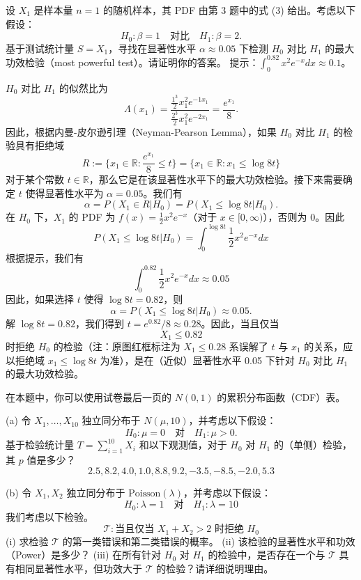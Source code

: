 \begin{questions}
\question
设 $X_1$ 是样本量 $n=1$ 的随机样本，其 PDF 由第 3 题中的式 (3) 给出。考虑以下假设：
\[
H_0 : \beta = 1 \quad \text{对比} \quad H_1 : \beta = 2.
\]
基于测试统计量 $S = X_1$，寻找在显著性水平 $\alpha \approx 0.05$ 下检测 $H_0$ 对比 $H_1$ 的最大功效检验（most powerful test）。请证明你的答案。
提示：$\int_0^{0.82} x^2 e^{-x} dx \approx 0.1$。

\begin{solution}
$H_0$ 对比 $H_1$ 的似然比为
\[
\Lambda(x_1) = \frac{\frac{1^3}{2} x_1^2 e^{-1x_1}}{\frac{2^3}{2} x_1^2 e^{-2x_1}} = \frac{e^{x_1}}{8}.
\]
因此，根据内曼-皮尔逊引理（Neyman-Pearson Lemma），如果 $H_0$ 对比 $H_1$ 的检验具有拒绝域
\[
R := \{x_1 \in \mathbb{R} : \frac{e^{x_1}}{8} \le t\} = \{x_1 \in \mathbb{R} : x_1 \le \log 8t\}
\]
对于某个常数 $t \in \mathbb{R}$，那么它是在该显著性水平下的最大功效检验。接下来需要确定 $t$ 使得显著性水平为 $\alpha = 0.05$。我们有
\[
\alpha = P(X_1 \in R | H_0) = P(X_1 \le \log 8t | H_0).
\]
在 $H_0$ 下，$X_1$ 的 PDF 为 $f(x) = \frac{1}{2} x^2 e^{-x}$（对于 $x \in [0, \infty)$），否则为 0。因此
\[
P(X_1 \le \log 8t | H_0) = \int_0^{\log 8t} \frac{1}{2} x^2 e^{-x} dx
\]
根据提示，我们有
\[
\int_0^{0.82} \frac{1}{2} x^2 e^{-x} dx \approx 0.05
\]
因此，如果选择 $t$ 使得 $\log 8t = 0.82$，则
\[
\alpha = P(X_1 \le \log 8t | H_0) \approx 0.05.
\]
解 $\log 8t = 0.82$，我们得到 $t = e^{0.82}/8 \approx 0.28$。因此，当且仅当
\[
X_1 \le 0.82
\]
时拒绝 $H_0$ 的检验（注：原图红框标注为 $X_1 \le 0.28$ 系误解了 $t$ 与 $x_1$ 的关系，应以拒绝域 $x_1 \le \log 8t$ 为准），是在（近似）显著性水平 0.05 下针对 $H_0$ 对比 $H_1$ 的最大功效检验。
\end{solution}

\question
在本题中，你可以使用试卷最后一页的 $N(0, 1)$ 的累积分布函数（CDF）表。

(a) 令 $X_1, \ldots, X_{10}$ 独立同分布于 $N(\mu, 10)$，并考虑以下假设：
\[
H_0 : \mu = 0 \quad \text{对} \quad H_1 : \mu > 0.
\]
基于检验统计量 $T = \sum_{i=1}^{10} X_i$ 和以下观测值，对于 $H_0$ 对 $H_1$ 的（单侧）检验，其 $p$ 值是多少？
\[
2.5, 8.2, 4.0, 1.0, 8.8, 9.2, -3.5, -8.5, -2.0, 5.3
\]

(b) 令 $X_1, X_2$ 独立同分布于 $\text{Poisson}(\lambda)$，并考虑以下假设：
\[
H_0 : \lambda = 1 \quad \text{对} \quad H_1 : \lambda = 10
\]
我们考虑以下检验。
\[
\mathcal{T} : \text{当且仅当 } X_1 + X_2 > 2 \text{ 时拒绝 } H_0
\]
(i) 求检验 $\mathcal{T}$ 的第一类错误和第二类错误的概率。
(ii) 该检验的显著性水平和功效（Power）是多少？
(iii) 在所有针对 $H_0$ 对 $H_1$ 的检验中，是否存在一个与 $\mathcal{T}$ 具有相同显著性水平，但功效大于 $\mathcal{T}$ 的检验？请详细说明理由。


\end{questions}
